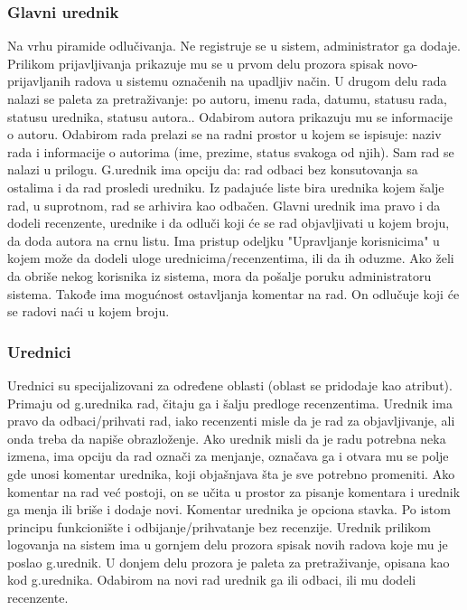 \documentclass[a4paper]{article}
\begin{document}
    \subsubsection{Glavni urednik}
    Na vrhu piramide odlučivanja. Ne registruje se u sistem, administrator ga dodaje. Prilikom prijavljivanja prikazuje mu se u prvom delu prozora spisak novo-prijavljanih radova u sistemu označenih na upadljiv način. U drugom delu rada nalazi se paleta za pretraživanje: po autoru, imenu rada, datumu, statusu rada, statusu urednika, statusu autora.. Odabirom autora prikazuju mu se informacije o autoru. Odabirom rada prelazi se na radni prostor u kojem se ispisuje: naziv rada i informacije o autorima (ime, prezime, status svakoga od njih). Sam rad se nalazi u prilogu. G.urednik ima opciju da: rad odbaci bez konsutovanja sa ostalima i da rad prosledi uredniku. Iz padajuće liste bira urednika kojem šalje rad, u suprotnom, rad se arhivira kao odbačen. Glavni urednik ima pravo i da dodeli recenzente, urednike i da odluči koji će se rad objavljivati u kojem broju, da doda autora na crnu listu. Ima pristup odeljku "Upravljanje korisnicima" u kojem može da dodeli uloge urednicima/recenzentima, ili da ih oduzme. Ako želi da obriše nekog korisnika iz sistema, mora da pošalje poruku administratoru sistema. Takođe ima mogućnost ostavljanja komentar na rad. On odlučuje koji će se radovi naći u kojem broju.

    \subsubsection{Urednici}
    Urednici su specijalizovani za određene oblasti (oblast se pridodaje kao atribut). Primaju od g.urednika rad, čitaju ga i šalju predloge recenzentima. Urednik ima pravo da odbaci/prihvati rad, iako recenzenti misle da je rad za objavljivanje, ali onda treba da napiše obrazloženje. Ako urednik misli da je radu potrebna neka izmena, ima opciju da rad označi za menjanje, označava ga i otvara mu se polje gde unosi komentar urednika, koji objašnjava šta je sve potrebno promeniti. Ako komentar  na rad već postoji, on se učita u prostor za pisanje komentara i urednik ga menja ili briše i dodaje novi. Komentar urednika je opciona stavka. Po istom principu funkcionište i odbijanje/prihvatanje bez recenzije. Urednik prilikom logovanja na sistem ima u gornjem delu prozora spisak novih radova koje mu je poslao g.urednik. U donjem delu prozora je paleta za pretraživanje, opisana kao kod g.urednika. Odabirom na novi rad urednik ga ili odbaci, ili mu dodeli recenzente.
\end{document}
